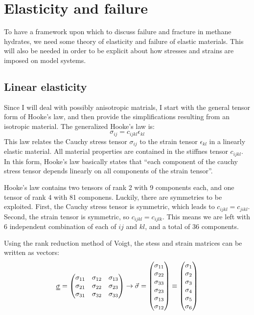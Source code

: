  \chapter{Elasticity and failure}
 To have a framework upon which to discuss failure and fracture in methane hydrates, we need some theory of elasticity and failure of elastic materials. This will also be needed in order to be explicit about how stresses and strains are imposed on model systems.

 \section{Linear elasticity}
Since I will deal with possibly anisotropic matrials, I start with the general tensor form of Hooke's law, and then provide the simplifications resulting from an isotropic material.
The generalized Hooke's law	is:
\begin{equation}
	\sigma_{ij} = c_{ijkl}\epsilon_{kl}
\end{equation}
This law relates the Cauchy stress tensor $\sigma_{ij}$ to the strain tensor $\epsilon_{kl}$ in a linearly elastic material. All material properties are contained in the stiffnes tensor $c_{ijkl}$.
In this form, Hooke's law basically states that ``each component of the cauchy stress tensor depends linearly on all components of the strain tensor''. 

Hooke's law contains two tensors of rank 2 with 9 components each, and one tensor of rank 4 with 81 componens. Luckily, there are symmetries to be exploited. First, the Cauchy stress tensor is symmetric, which leads to $c_{ijkl} = c_{jikl}$. Second, the strain tensor is symmetric, so $c_{ijkl} = c_{ijlk}$. This means we are left with 6 independent combination of each of $ij$ and $kl$, and a total of 36 components. 

Using the rank reduction method of Voigt, the stess and strain matrices can be written as vectors:
\begin{equation}
	\uuline{\sigma} = 
	\begin{pmatrix}
	\sigma_{11} & \sigma_{12} & \sigma_{13} \\
	\sigma_{21} & \sigma_{22} & \sigma_{23} \\
	\sigma_{31} & \sigma_{32} & \sigma_{33} \\ 
	\end{pmatrix}
	\to 
	\vec{\sigma} = 
	\begin{pmatrix}
	\sigma_{11} \\ \sigma_{22} \\ \sigma_{33} \\ \sigma_{23} \\ \sigma_{13} \\ \sigma_{12}
	\end{pmatrix}
	\equiv
	\begin{pmatrix}
	\sigma_{1} \\ \sigma_{2} \\ \sigma_{3} \\ \sigma_{4} \\ \sigma_{5} \\ \sigma_{6}
	\end{pmatrix}
\end{equation}

